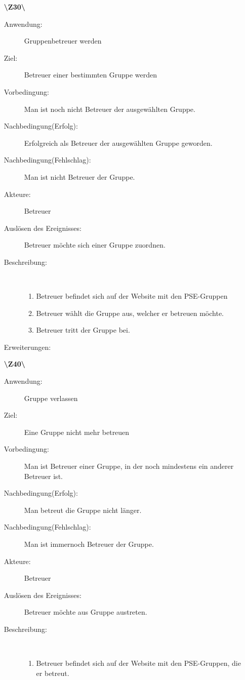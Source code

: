 \documentclass[a4paper]{article}
\begin{document}
\begin{enumerate}
\pagebreak
  \item[\textbf{\textbackslash Z30\textbackslash}]
	\begin{description}
  		\item[Anwendung:] Gruppenbetreuer werden
  		\item[Ziel:] Betreuer einer bestimmten Gruppe werden
  		\item[Vorbedingung:] Man ist noch nicht Betreuer der ausgewählten Gruppe.
  		\item[Nachbedingung(Erfolg):] Erfolgreich als Betreuer der ausgewählten Gruppe geworden.
  		\item[Nachbedingung(Fehlschlag):] Man ist nicht Betreuer der Gruppe.
  		\item[Akteure:] Betreuer
  		\item[Auslösen des Ereignisses:] Betreuer möchte sich einer Gruppe zuordnen.
  		\item[Beschreibung:]~
  	\begin{enumerate}[1.]
  	  \item Betreuer befindet sich auf der Website mit den PSE-Gruppen
  	  \item Betreuer wählt die Gruppe aus, welcher er betreuen möchte.
  	  \item Betreuer tritt der Gruppe bei.
  	\end{enumerate}
  	\item[Erweiterungen:]
  \end{description}
  \pagebreak
  \item[\textbf{\textbackslash Z40\textbackslash}]
	\begin{description}
  		\item[Anwendung:] Gruppe verlassen
  		\item[Ziel:] Eine Gruppe nicht mehr betreuen
  		\item[Vorbedingung:] Man ist Betreuer einer Gruppe, in der noch mindestens ein anderer Betreuer ist.
  		\item[Nachbedingung(Erfolg):] Man betreut die Gruppe nicht länger.
  		\item[Nachbedingung(Fehlschlag):] Man ist immernoch Betreuer der Gruppe.
  		\item[Akteure:] Betreuer
  		\item[Auslösen des Ereignisses:] Betreuer möchte aus Gruppe austreten.
  		\item[Beschreibung:]~
  	\begin{enumerate}[1.]
  	  \item Betreuer befindet sich auf der Website mit den PSE-Gruppen, die er betreut.

\end{enumerate}
\end{description}
\end{enumerate}
\end{document}

